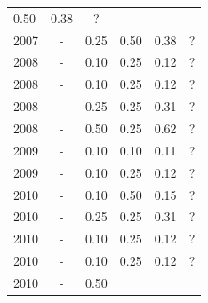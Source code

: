 \begin{table}[H]
\begin{tabular}{| l | c | c | c | c | c |}
          0.50
          &
            {\color{red} 0.38}
          &
          ?
          \\
            2007
          &
          -
          &
          0.25
          &
          0.50
          &
            {\color{red} 0.38}
          &
          ?
          \\
\hline
            2008
          &
          -
          &
          0.10
          &
          0.25
          &
            {\color{red} 0.12}
          &
          ?
          \\
            2008
          &
          -
          &
          0.10
          &
          0.25
          &
            {\color{red} 0.12}
          &
          ?
          \\
            2008
          &
          -
          &
          0.25
          &
          0.25
          &
            {\color{red} 0.31}
          &
          ?
          \\
            2008
          &
          -
          &
          0.50
          &
          0.25
          &
            {\color{blue} 0.62}
          &
          ?
          \\
\hline
            2009
          &
          -
          &
          0.10
          &
          0.10
          &
            {\color{red} 0.11}
          &
          ?
          \\
            2009
          &
          -
          &
          0.10
          &
          0.25
          &
            {\color{red} 0.12}
          &
          ?
          \\
\hline
            2010
          &
          -
          &
          0.10
          &
          0.50
          &
            {\color{red} 0.15}
          &
          ?
          \\
            2010
          &
          -
          &
          0.25
          &
          0.25
          &
            {\color{red} 0.31}
          &
          ?
          \\
            2010
          &
          -
          &
          0.10
          &
          0.25
          &
            {\color{red} 0.12}
          &
          ?
          \\
            2010
          &
          -
          &
          0.10
          &
          0.25
          &
            {\color{red} 0.12}
          &
          ?
          \\
            2010
          &
          -
          &
          0.50
          &

\end{tabular}
\end{table}
